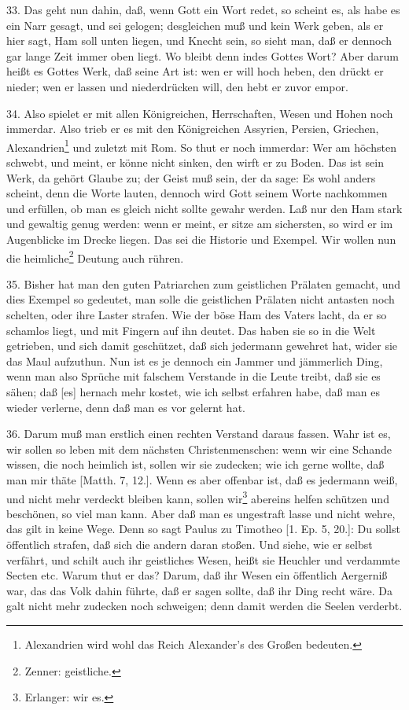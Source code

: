 33. Das geht nun dahin, daß, wenn Gott ein Wort redet, so scheint es, als habe es ein Narr gesagt, und sei gelogen; desgleichen muß
und kein Werk geben, als er hier sagt, Ham soll unten liegen, und Knecht sein, so sieht man, daß er dennoch gar lange Zeit immer oben liegt. Wo bleibt denn indes Gottes Wort? Aber darum heißt es Gottes Werk, daß seine Art ist: wen er will hoch heben, den drückt er nieder; wen er lassen und niederdrücken will, den hebt er zuvor empor.

34. Also spielet er mit allen Königreichen, Herrschaften, Wesen und Hohen noch immerdar. Also trieb er es mit den Königreichen Assyrien, Persien, Griechen, Alexandrien\footnote{Alexandrien wird wohl das Reich Alexander's des Großen bedeuten.} und zuletzt mit Rom. So thut er noch immerdar: Wer am höchsten schwebt, und meint, er könne nicht sinken, den wirft er zu Boden. Das ist sein Werk, da gehört Glaube zu; der Geist muß sein, der da sage: Es wohl anders scheint, denn die Worte lauten, dennoch wird Gott seinem Worte nachkommen und erfüllen, ob man es gleich nicht sollte gewahr werden. Laß nur den Ham stark und gewaltig genug werden: wenn er meint, er sitze am sichersten, so wird er im Augenblicke im Drecke liegen. Das sei die Historie und Exempel. Wir wollen nun die heimliche\footnote{Zenner: geistliche.} Deutung auch rühren.

35. Bisher hat man den guten Patriarchen zum geistlichen Prälaten gemacht, und dies Exempel so gedeutet, man solle die geistlichen Prälaten nicht antasten noch schelten, oder ihre Laster strafen. Wie der böse Ham des Vaters lacht, da er so schamlos liegt, und mit Fingern auf ihn deutet. Das haben sie so in die Welt getrieben, und sich damit geschützet, daß sich jedermann gewehret hat, wider sie das Maul aufzuthun. Nun ist es je dennoch ein Jammer und jämmerlich Ding, wenn man also Sprüche mit falschem Verstande in die Leute treibt, daß sie es sähen; daß [es] hernach mehr kostet, wie ich selbst erfahren habe, daß man es wieder verlerne, denn daß man es vor gelernt hat.

36. Darum muß man erstlich einen rechten Verstand daraus fassen. Wahr ist es, wir sollen so leben mit dem nächsten Christenmenschen: wenn wir eine Schande wissen, die noch heimlich ist, sollen wir sie zudecken; wie ich gerne wollte, daß man mir thäte [Matth. 7, 12.]. Wenn es aber offenbar ist, daß es jedermann weiß, und nicht mehr verdeckt bleiben kann, sollen wir\footnote{Erlanger: wir es.} abereins helfen schützen und beschönen, so viel man kann. Aber daß man es ungestraft lasse und nicht wehre, das gilt in keine Wege. Denn so sagt Paulus zu Timotheo [1. Ep. 5, 20.]: Du sollst öffentlich strafen, daß sich die andern daran stoßen. Und siehe, wie er selbst verfährt, und schilt auch ihr geistliches Wesen, heißt sie Heuchler und verdammte Secten etc. Warum thut er das? Darum, daß ihr Wesen ein öffentlich Aergerniß war, das das Volk dahin führte, daß er sagen sollte, daß ihr Ding recht wäre. Da galt nicht mehr zudecken noch schweigen; denn damit werden die Seelen verderbt.

